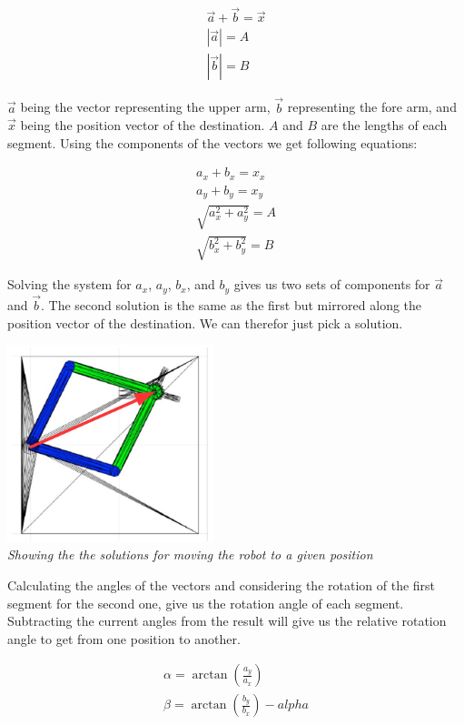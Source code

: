 \begin{align*}
\vec{a}  + \vec{b} = \vec{x}\\
|\vec{a}| = A\\
|\vec{b}| = B
\end{align*}

$\vec{a}$ being the vector representing the upper arm, $\vec{b}$ representing the fore arm, and $\vec{x}$ being the position vector of the destination. $A$ and $B$ are the lengths of each segment. Using the components of the vectors we get following equations:

\begin{align*}
a_x + b_x = x_x\\
a_y + b_y = x_y\\
\sqrt{a_x^2 + a_y^2} = A\\
\sqrt{b_x^2 + b_y^2} = B
\end{align*}

Solving the system for $a_x$, $a_y$, $b_x$, and $b_y$ gives us two sets of components for $\vec{a}$ and $\vec{b}$. The second solution is the same as the first but mirrored along the position vector of the destination. We can therefor just pick a solution.

\begin{center}
\includegraphics[width=0.45\textwidth]{imgs/AngleCalc/robot_altSolution.jpg}\\
\textit{Showing the the solutions for moving the robot to a given position}
\end{center}

\pagebreak

Calculating the angles of the vectors and considering the rotation of the first segment for the second one, give us the rotation angle of each segment. Subtracting the current angles from the result will give us the relative rotation angle to get from one position to another.

\begin{align*}
\alpha = \arctan(\frac{a_y}{a_x})\\
\beta = \arctan(\frac{b_y}{b_x}) - alpha
\end{align*}

